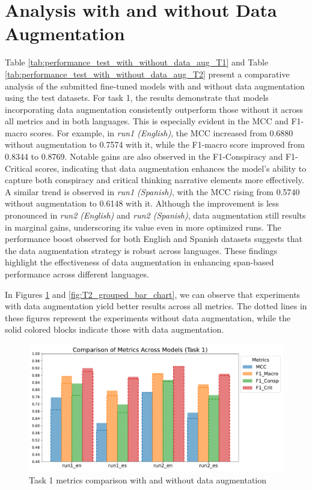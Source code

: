\documentclass{Configuration_Files/PoliMi3i_thesis}
\begin{document}
\section{Analysis with and without Data Augmentation} \label{sec:analysis_with_without_data_aug}
Table \ref{tab:performance_test_with_without_data_aug_T1} and Table \ref{tab:performance_test_with_without_data_aug_T2} present a comparative analysis of the submitted fine-tuned models with and without data augmentation using the test datasets. For task 1, the results demonstrate that models incorporating data augmentation consistently outperform those without it across all metrics and in both languages. This is especially evident in the MCC and F1-macro scores. For example, in \textit{run1 (English)}, the MCC increased from 0.6880 without augmentation to 0.7574 with it, while the F1-macro score improved from 0.8344 to 0.8769. Notable gains are also observed in the F1-Conspiracy and F1-Critical scores, indicating that data augmentation enhances the model's ability to capture both conspiracy and critical thinking narrative elements more effectively. A similar trend is observed in \textit{run1 (Spanish)}, with the MCC rising from 0.5740 without augmentation to 0.6148 with it. Although the improvement is less pronounced in \textit{run2 (English)} and \textit{run2 (Spanish)}, data augmentation still results in marginal gains, underscoring its value even in more optimized runs. The performance boost observed for both English and Spanish datasets suggests that the data augmentation strategy is robust across languages. These findings highlight the effectiveness of data augmentation in enhancing span-based performance across different languages.

In Figures \ref{fig:T1_grouped_bar_chart} and \ref{fig:T2_grouped_bar_chart}, we can observe that experiments with data augmentation yield better results across all metrics. The dotted lines in these figures represent the experiments without data augmentation, while the solid colored blocks indicate those with data augmentation.

\begin{figure}[h]
 \centering
 \includegraphics[width=0.92\linewidth, height=0.30\textheight]{Images/task1_bar_plot_comparison_adjusted_v2.pdf}
 \caption{Task 1 metrics comparison with and without data augmentation}
 \label{fig:T1_grouped_bar_chart}
\end{figure}
\FloatBarrier
\end{document}
